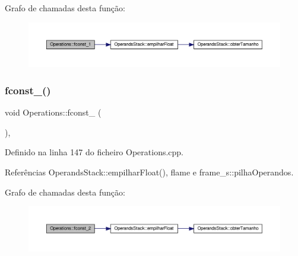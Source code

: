 Grafo de chamadas desta função\+:
\nopagebreak
\begin{figure}[H]
\begin{center}
\leavevmode
\includegraphics[width=350pt]{classOperations_aa2053d7f3d410a4531f5bd560b4211b4_cgraph}
\end{center}
\end{figure}
\mbox{\label{classOperations_a1857c1a0e34d6f91dcb7166ca6d678a2}} 
\subsubsection{\texorpdfstring{fconst\+\_()}{fconst\_2()}}
{\footnotesize\ttfamily void Operations\+::fconst\+\_ (\begin{DoxyParamCaption}{ }\end{DoxyParamCaption})\hspace{0.3cm}{\ttfamily [static]}, {\ttfamily [private]}}



Definido na linha 147 do ficheiro Operations.\+cpp.



Referências Operands\+Stack\+::empilhar\+Float(), flame e frame\+\_\+s\+::pilha\+Operandos.

Grafo de chamadas desta função\+:
\nopagebreak
\begin{figure}[H]
\begin{center}
\leavevmode
\includegraphics[width=350pt]{classOperations_a1857c1a0e34d6f91dcb7166ca6d678a2_cgraph}
\end{center}
\end{figure}
\mbox{\label{classOperations_a85d79532189d640a6d02c99f204d2229}} 
